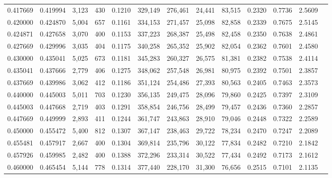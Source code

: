 \begin{tabular}{rrrrrrrrrrrrr}
0.417669 & 0.419994 &  3,123 &   430 &                                     0.1210 & 329,149 & 276,461 &  24,441 &  83,515 & 0.2320 & 0.7736 & 2.5609 \\
0.420000 & 0.424870 &  5,004 &   657 &                                     0.1161 & 334,153 & 271,457 &  25,098 &  82,858 & 0.2339 & 0.7675 & 2.5145 \\
0.424871 & 0.427658 &  3,070 &   400 &                                     0.1153 & 337,223 & 268,387 &  25,498 &  82,458 & 0.2350 & 0.7638 & 2.4861 \\
0.427669 & 0.429996 &  3,035 &   404 &                                     0.1175 & 340,258 & 265,352 &  25,902 &  82,054 & 0.2362 & 0.7601 & 2.4580 \\
0.430000 & 0.435041 &  5,025 &   673 &                                     0.1181 & 345,283 & 260,327 &  26,575 &  81,381 & 0.2382 & 0.7538 & 2.4114 \\
0.435041 & 0.437666 &  2,779 &   406 &                                     0.1275 & 348,062 & 257,548 &  26,981 &  80,975 & 0.2392 & 0.7501 & 2.3857 \\
0.437669 & 0.439986 &  3,062 &   412 &                                     0.1186 & 351,124 & 254,486 &  27,393 &  80,563 & 0.2405 & 0.7463 & 2.3573 \\
0.440000 & 0.445003 &  5,011 &   703 &                                     0.1230 & 356,135 & 249,475 &  28,096 &  79,860 & 0.2425 & 0.7397 & 2.3109 \\
0.445003 & 0.447668 &  2,719 &   403 &                                     0.1291 & 358,854 & 246,756 &  28,499 &  79,457 & 0.2436 & 0.7360 & 2.2857 \\
0.447669 & 0.449999 &  2,893 &   411 &                                     0.1244 & 361,747 & 243,863 &  28,910 &  79,046 & 0.2448 & 0.7322 & 2.2589 \\
0.450000 & 0.455472 &  5,400 &   812 &                                     0.1307 & 367,147 & 238,463 &  29,722 &  78,234 & 0.2470 & 0.7247 & 2.2089 \\
0.455481 & 0.457917 &  2,667 &   400 &                                     0.1304 & 369,814 & 235,796 &  30,122 &  77,834 & 0.2482 & 0.7210 & 2.1842 \\
0.457926 & 0.459985 &  2,482 &   400 &                                     0.1388 & 372,296 & 233,314 &  30,522 &  77,434 & 0.2492 & 0.7173 & 2.1612 \\
0.460000 & 0.465454 &  5,144 &   778 &                                     0.1314 & 377,440 & 228,170 &  31,300 &  76,656 & 0.2515 & 0.7101 & 2.1135 \\

\end{tabular}
